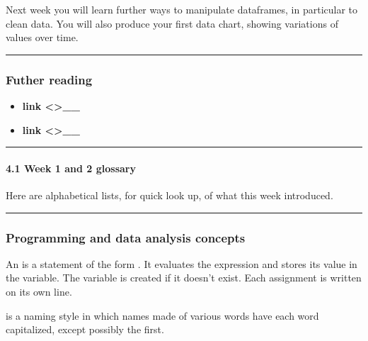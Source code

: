 \documentclass[letterpaper,10pt,english]{sphinxmanual}
\begin{document}
Next week you will learn further ways to manipulate dataframes, in particular to clean data. You will also produce your first data chart, showing variations of values over time.


\bigskip\hrule\bigskip



\subsubsection{Futher reading}
\label{\detokenize{content/session_02/Part_02_04:Futher-reading}}\begin{itemize}
\item {} 
 {\color{red}\bfseries{}\textasciigrave{}link \textless{}\textgreater{}\textasciigrave{}\_\_}

\item {} 
 {\color{red}\bfseries{}\textasciigrave{}link \textless{}\textgreater{}\textasciigrave{}\_\_}

\end{itemize}


\bigskip\hrule\bigskip



\paragraph{4.1 Week 1 and 2 glossary}
\label{\detokenize{content/session_02/Part_02_04:4.1-Week-1-and-2-glossary}}
Here are alphabetical lists, for quick look up, of what this week introduced.


\bigskip\hrule\bigskip



\subsubsection{Programming and data analysis concepts}
\label{\detokenize{content/session_02/Part_02_04:Programming-and-data-analysis-concepts}}
An  is a statement of the form  . It evaluates the expression and stores its value in the variable. The variable is created if it doesn’t exist. Each assignment is written on its own line.

 is a naming style in which names made of various words have each word capitalized, except possibly the first.
\end{document}
